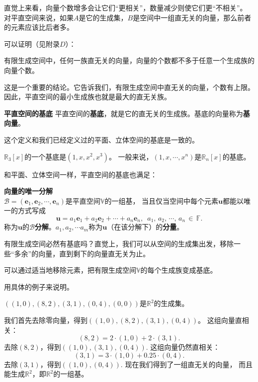 \documentclass[12pt,UTF8]{ctexbook}
\begin{document}
直觉上来看，向量个数增多会让它们“更相关”，数量减少则使它们更“不相关”。
对平直空间来说，如果$A$是它的生成集，$B$是空间中一组直无关的向量，那么前者的元素应该比后者多。

可以证明（见附录$D$）：
\begin{tm}\label{tm:4-3-10}
    有限生成空间中，任何一族直无关的向量，向量的个数都不多于任意一个生成族的向量个数。
\end{tm}
这是一个重要的结论。它告诉我们，有限生成空间中直无关的向量，个数有上限。
因此，平直空间的最小生成族也就是最大的直无关族。

\begin{df}{\textbf{平直空间的基底}}
    平直空间的\textbf{基底}，就是它的直无关的生成族。基底的向量称为\textbf{基向量}。
\end{df}

这个定义和我们已经定义过的平面、立体空间的基底是一致的。

$\mathbb{R}_3[x]$的一个基底是$(1, x, x^2, x^3)$。
一般来说，$(1, x, \cdots, x^n)$是$\mathbb{R}_n[x]$的基底。

和平面、立体空间一样，平直空间的基底也满足：
\begin{tm}{\textbf{向量的唯一分解}}\label{tm:4-3-20}\\
    $ \mathcal{B} = (\mathbf{e}_1, \mathbf{e}_2, \cdots , \mathbf{e}_n )$是平直空间$\mathbb{V}$的一组基，
    当且仅当空间中每个元素$\mathbf{u}$都能以唯一的方式写成
    $$ \mathbf{u} = a_1\mathbf{e}_1 +a_2 \mathbf{e}_2 + \cdots + a_n\mathbf{e}_n, \,\,\, a_1,\,a_2,\,\cdots,\, a_n \,\in\,\mathbb{F}.$$
    称为$\mathbf{u}$的$\mathcal{B}$\textbf{分解}。$a_1, a_2, \cdots a_m$称为$\mathbf{u}$（在该分解下）的\textbf{分量}。
\end{tm}

有限生成空间必然有基底吗？直觉上，我们可以从空间的生成集出发，移除一些“多余”的向量，直到剩下的向量直无关为止。

\begin{tm}\label{tm:4-3-40}
    可以通过适当地移除元素，把有限生成空间$\mathbb{V}$的每个生成族变成基底。
\end{tm}

用具体的例子来说明。

$\left((1,0),(8,2),(3,1),(0,4),(0,0)\right)$是$\mathbb{R}^2$的生成集。

我们首先去除零向量，得到$\left((1,0),(8,2),(3,1),(0,4)\right)$。 
这组向量直相关：
$$ (8,2) = 2\cdot(1,0) + 2\cdot(3,1).$$
去除$(8,2)$，得到$\left((1,0),(3,1),(0,4)\right).$ 这组向量仍然直相关：
$$ (3,1) = 3\cdot(1,0) + 0.25\cdot(0,4).$$
去除$(3,1)$，得到$\left((1,0),(0,4)\right).$ 现在我们得到了一组直无关的向量，
而且能生成$\mathbb{R}^2$，即$\mathbb{R}^2$的一组基。
\end{document}
